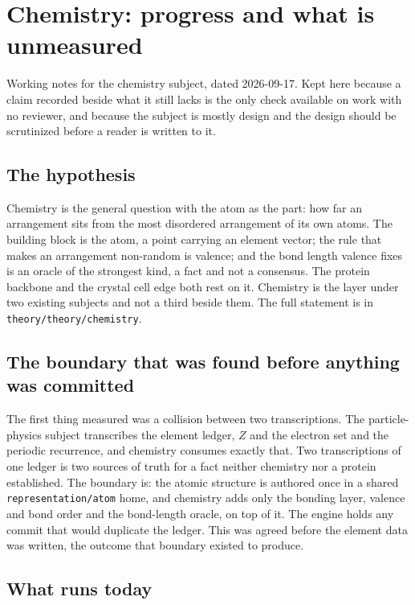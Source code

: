 \chapter{Chemistry: progress and what is unmeasured}

Working notes for the chemistry subject, dated 2026-09-17. Kept here because a claim recorded beside
what it still lacks is the only check available on work with no reviewer, and because the subject is
mostly design and the design should be scrutinized before a reader is written to it.

\section*{The hypothesis}

Chemistry is the general question with the atom as the part: how far an arrangement sits from the most
disordered arrangement of its own atoms. The building block is the atom, a point carrying an element
vector; the rule that makes an arrangement non-random is valence; and the bond length valence fixes is
an oracle of the strongest kind, a fact and not a consensus. The protein backbone and the crystal
cell edge both rest on it. Chemistry is the layer under two existing subjects and not a third
beside them. The full statement is in \texttt{theory/theory/chemistry}.

\section*{The boundary that was found before anything was committed}

The first thing measured was a collision between two transcriptions. The particle-physics subject transcribes the
element ledger, \(Z\) and the electron set and the periodic recurrence, and chemistry consumes exactly
that. Two transcriptions of one ledger is two sources of truth for a fact neither chemistry nor a
protein established. The boundary is: the atomic structure is authored once in a shared
\texttt{representation/atom} home, and chemistry adds only the bonding layer, valence and bond order
and the bond-length oracle, on top of it. The engine holds any commit that would duplicate the
ledger. This was agreed before the element data was written, the outcome that boundary
existed to produce.

\section*{What runs today}

